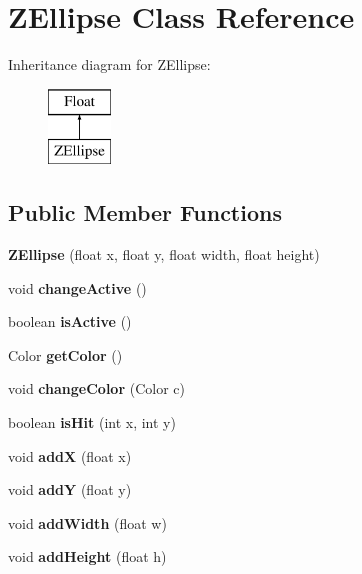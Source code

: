 \hypertarget{class_z_ellipse}{}\section{Z\+Ellipse Class Reference}
\label{class_z_ellipse}
Inheritance diagram for Z\+Ellipse\+:\begin{figure}[H]
\begin{center}
\leavevmode
\includegraphics[height=2.000000cm]{class_z_ellipse}
\end{center}
\end{figure}
\subsection*{Public Member Functions}
\begin{DoxyCompactItemize}
\item 
\mbox{\label{class_z_ellipse_ae0c643fe69b8daaa92fedb71d343c2c2}} 
{\bfseries Z\+Ellipse} (float x, float y, float width, float height)
\item 
\mbox{\label{class_z_ellipse_a1e4d268bc44ca7d86bfe6ee56614270e}} 
void {\bfseries change\+Active} ()
\item 
\mbox{\label{class_z_ellipse_a12fccf373e68bedfe75ca4de6b442157}} 
boolean {\bfseries is\+Active} ()
\item 
\mbox{\label{class_z_ellipse_a71b85d8bf2da93f76cb8fd250d14086e}} 
Color {\bfseries get\+Color} ()
\item 
\mbox{\label{class_z_ellipse_a81e08ad0fd085a1f06ef39b26403b9b7}} 
void {\bfseries change\+Color} (Color c)
\item 
\mbox{\label{class_z_ellipse_acade6d1a85051ec181e916b77ec47d19}} 
boolean {\bfseries is\+Hit} (int x, int y)
\item 
\mbox{\label{class_z_ellipse_ae3273269cea9b18ed643d858ff92906f}} 
void {\bfseries addX} (float x)
\item 
\mbox{\label{class_z_ellipse_aa2c979d23313a02418be0d6b7a98778f}} 
void {\bfseries addY} (float y)
\item 
\mbox{\label{class_z_ellipse_a0556391e87d9bad231ea415aec9beed8}} 
void {\bfseries add\+Width} (float w)
\item 
\mbox{\label{class_z_ellipse_a32d292e4f1d950cd3277a22a35ae8ab6}} 
void {\bfseries add\+Height} (float h)
\end{DoxyCompactItemize}
